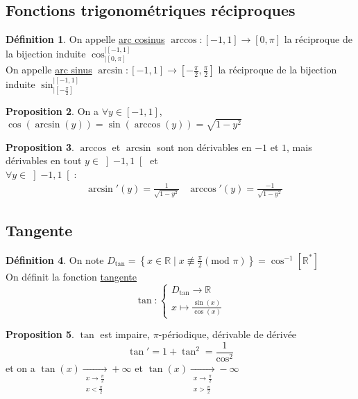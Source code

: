 \documentclass[10pt,a4paper]{article}
\theoremstyle{definition}
\newtheorem{proposition}{Proposition}[section]
\newtheorem{definition}[proposition]{Définition}
\begin{document}
\subsection{Fonctions trigonométriques réciproques}
\begin{definition}
On appelle \uline{arc cosinus} $\arccos: [-1, 1] \to [0, \pi]$ la réciproque de la bijection induite $\cos_{|[0, \pi]}^{|[-1, 1]}$ \\
On appelle \uline{arc sinus} $\arcsin : [-1, 1] \to [-\frac{\pi}{2}, \frac{\pi}{2}]$ la réciproque de la bijection induite $\sin_{|[-\frac{\pi}{2}]}^{|[-1, 1]}$
\end{definition}
\begin{proposition}
On a $\forall y \in [-1, 1]$, $\cos(\arcsin(y)) = \sin(\arccos(y)) = \sqrt{1 - y^2}$
\end{proposition}
\begin{proposition}
$\arccos$ et $\arcsin$ sont non dérivables en $-1$ et $1$, mais dérivables en tout $y \in \left] -1, 1 \right[$ et \\
$\forall y \in \left] -1, 1 \right[$:
\begin{align*}
&\arcsin'(y) = \frac{1}{\sqrt{1 - y^2}} &\arccos'(y) = \frac{-1}{\sqrt{1 - y^2}}
\end{align*}
\end{proposition}

\subsection{Tangente}
\begin{definition}
On note $D_\text{tan} = \left\{ x \in \mathbb{R} \mid x \not\equiv \frac{\pi}{2} (\text{mod } \pi) \right\} = \cos^{-1}[\mathbb{R}^*]$ \\
On définit la fonction \uline{tangente}
\[\tan: \begin{cases}
D_\text{tan} \to \mathbb{R} \\
x \mapsto \frac{\sin(x)}{\cos(x)}
\end{cases}\]
\end{definition}
\begin{proposition}
$\tan$ est impaire, $\pi$-périodique, dérivable de dérivée
\[\tan' = 1 + \tan^2 = \frac{1}{\cos^2}\]
et on a $\tan(x) \xrightarrow[\substack{x \to \frac{\pi}{2} \\ x < \frac{\pi}{2}}]{} + \infty$ et $\tan(x) \xrightarrow[\substack{x \to \frac{\pi}{2} \\ x > \frac{\pi}{2}}]{} -\infty$
\end{proposition}
\end{document}
